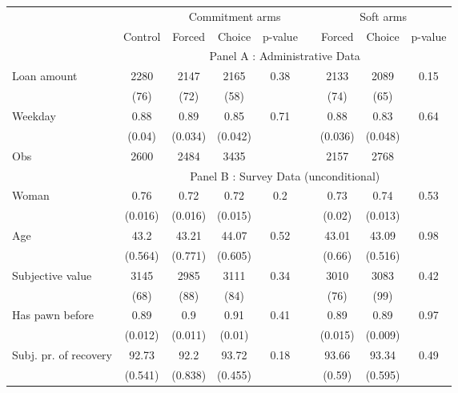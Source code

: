 \begin{tabular}{lcccccccc}
\toprule
      &       & \multicolumn{3}{c}{Commitment arms} &       & \multicolumn{3}{c}{Soft arms} \\
\cmidrule{3-5}\cmidrule{7-9}      & \multicolumn{1}{p{4.545em}}{Control} & \multicolumn{1}{p{4.955em}}{Forced} & \multicolumn{1}{p{3.455em}}{Choice} & \multicolumn{1}{p{3.455em}}{p-value} &       & \multicolumn{1}{p{4.045em}}{Forced} & \multicolumn{1}{p{4.045em}}{Choice } & \multicolumn{1}{p{4.545em}}{p-value} \\
\midrule
      & \multicolumn{8}{c}{Panel A : Administrative Data} \\
\midrule
\midrule
Loan amount  & 2280  & 2147  & 2165  & 0.38  &       & 2133  & 2089  & 0.15 \\
      & (76)  & (72)  & (58)  &       &       & (74)  & (65)  &  \\
Weekday & 0.88  & 0.89  & 0.85  & 0.71  &       & 0.88  & 0.83  & 0.64 \\
      & (0.04) & (0.034) & (0.042) &       &       & (0.036) & (0.048) &  \\
\midrule
Obs   & 2600  & 2484  & 3435  &       &       & 2157  & 2768  &  \\
\midrule
      & \multicolumn{8}{c}{Panel B : Survey Data (unconditional)} \\
\midrule
\midrule
Woman & 0.76  & 0.72  & 0.72  & 0.2   &       & 0.73  & 0.74  & 0.53 \\
      & (0.016) & (0.016) & (0.015) &       &       & (0.02) & (0.013) &  \\
Age   & 43.2  & 43.21 & 44.07 & 0.52  &       & 43.01 & 43.09 & 0.98 \\
      & (0.564) & (0.771) & (0.605) &       &       & (0.66) & (0.516) &  \\
Subjective value & 3145  & 2985  & 3111  & 0.34  &       & 3010  & 3083  & 0.42 \\
      & (68)  & (88)  & (84)  &       &       & (76)  & (99)  &  \\
Has pawn before & 0.89  & 0.9   & 0.91  & 0.41  &       & 0.89  & 0.89  & 0.97 \\
      & (0.012) & (0.011) & (0.01) &       &       & (0.015) & (0.009) &  \\
Subj. pr. of recovery & 92.73 & 92.2  & 93.72 & 0.18  &       & 93.66 & 93.34 & 0.49 \\
      & (0.541) & (0.838) & (0.455) &       &       & (0.59) & (0.595) &  \\

\end{tabular}
